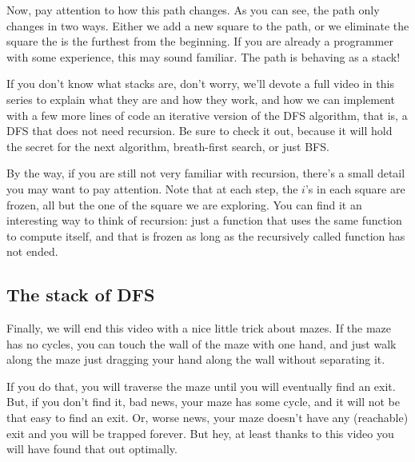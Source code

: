 \documentclass[12pt]{article}
\begin{document}
Now, pay attention to how this path changes. As you can see, the path only changes
in two ways. Either we add a new square to the path, or we eliminate the square
the is the furthest from the beginning. If you are already a programmer with some
experience, this may sound familiar. The path is behaving as a stack!

If you don't know what stacks are, don't worry, we'll devote a full video in
this series to explain what they are and how they work, and how we can implement 
with a few more lines of code an iterative version of the DFS algorithm,
that is, a DFS that does not
need recursion. Be sure to check it out, because it will hold the secret
for the next algorithm, breath-first search, or just BFS.

By the way, if you are still not very familiar with recursion, there's a small
detail you may want to pay attention. Note that at each step, the $i$'s in each
square are frozen, all but the one of the square we are exploring. You can find it
an interesting way to think of recursion: just a function that uses the same function to compute itself, and that is frozen as long as the recursively called function
has not ended.


\subsection{The stack of DFS}

Finally, we will end this video with a nice little trick about mazes. If
the maze has no cycles, you can touch the wall of the maze with one hand,
and just walk along the maze just dragging your hand along the wall without
separating it.

If you do that, you will traverse the maze until you will eventually find
an exit. But, if you don't find it, bad news, your maze has some cycle, and it
will not be that easy to find an exit. Or, worse news, your maze doesn't have any (reachable) exit
and you will be trapped forever. But hey, at least thanks to this video you will have found that
out optimally.
\end{document}
